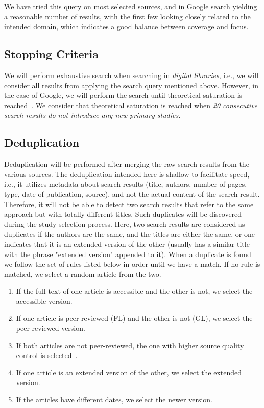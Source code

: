 \documentclass[review]{elsarticle}
\begin{document}
We have tried this query on most selected sources, and in Google search yielding a reasonable number of results, with the first few looking closely related to the intended domain, which indicates a good balance between coverage and focus.

\subsection{Stopping Criteria}
We will perform exhaustive search when searching in \textit{digital libraries}, i.e., we will consider all results from applying the search query mentioned above.
However, in the case of Google, we will perform the search until theoretical saturation is reached~\cite{Garousi2017MLR}.
We consider that theoretical saturation is reached when \textit{20 consecutive search results do not introduce any new primary studies.}

\subsection{Deduplication}
Deduplication will be performed after merging the raw search results from the various sources.
The deduplication intended here is shallow to facilitate speed, i.e., it utilizes metadata about search results (title, authors, number of pages, type, date of publication, source), and not the actual content of the search result.
Therefore, it will not be able to detect two search results that refer to the same approach but with totally different titles.
Such duplicates will be discovered during the study selection process.
Here, two search results are considered as duplicates if the authors are the same, and the titles are either the same, or one indicates that it is an extended version of the other (usually has a similar title with the phrase "extended version" appended to it).
When a duplicate is found we follow the set of rules listed below in order until we have a match.
If no rule is matched, we select a random article from the two.

\begin{enumerate}
	\item If the full text of one article is accessible and the other is not, we select the accessible version.
	\item If one article is peer-reviewed (FL) and the other is not (GL), we select the peer-reviewed version.
	\item If both articles are not peer-reviewed, the one with higher source quality control is selected~\cite{Garousi2017MLR}.
	\item If one article is an extended version of the other, we select the extended version.
	\item If the articles have different dates, we select the newer version.
\end{enumerate}
\end{document}
